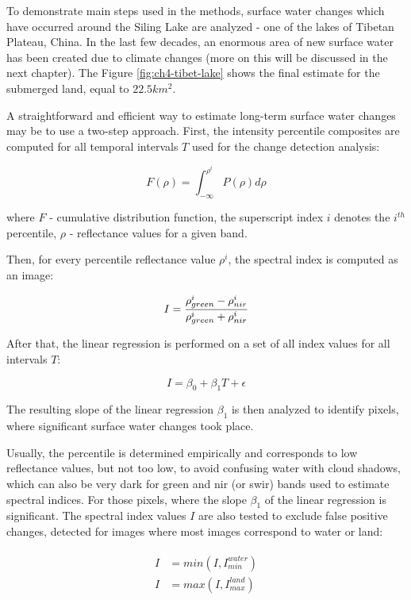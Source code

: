 To demonstrate main steps used in the methods, surface water changes which have occurred around the Siling Lake are analyzed - one of the lakes of Tibetan Plateau, China. In the last few decades, an enormous area of new surface water has been created due to climate changes (more on this will be discussed in the next chapter). The Figure \ref{fig:ch4-tibet-lake} shows the final estimate for the submerged land, equal to $22.5 km^2$. 

A straightforward and efficient way to estimate long-term surface water changes may be to use a two-step approach. First, the intensity percentile composites are computed for all temporal intervals $T$ used for the change detection analysis:

\begin{equation}
F(\rho) = \int_{-\infty}^{\rho^i} P(\rho)d\rho
\end{equation}

where $F$ - cumulative distribution function, the superscript index $i$ denotes the $i^{th}$ percentile, $\rho$ - reflectance values for a given band.

Then, for every percentile reflectance value $\rho^i$, the spectral index is computed as an image:

\begin{equation}
I = \frac{\rho_{green}^i-\rho_{nir}^i}{\rho_{green}^i+\rho_{nir}^i} \\
\end{equation}

After that, the linear regression is performed on a set of all index values for all intervals $T$:

\begin{equation}
I = \beta_0 + \beta_1 T + \epsilon
\end{equation}

The resulting slope of the linear regression $\beta_1$ is then analyzed to identify pixels, where significant surface water changes took place. 

Usually, the percentile is determined empirically and corresponds to low reflectance values, but not too low, to avoid confusing water with cloud shadows, which can also be very dark for green and nir (or swir) bands used to estimate spectral indices. For those pixels, where the slope $\beta_1$ of the linear regression is significant. The spectral index values $I$ are also tested to exclude false positive changes, detected for images where most images correspond to water or land:

\begin{equation}
\begin{split}
\begin{aligned}
I &= min\left(I, I_{min}^{water}\right) \\
I &= max\left(I, I_{max}^{land}\right) 
\end{aligned}
\end{split}
\label{eq:water-land-suppression}
\end{equation}


